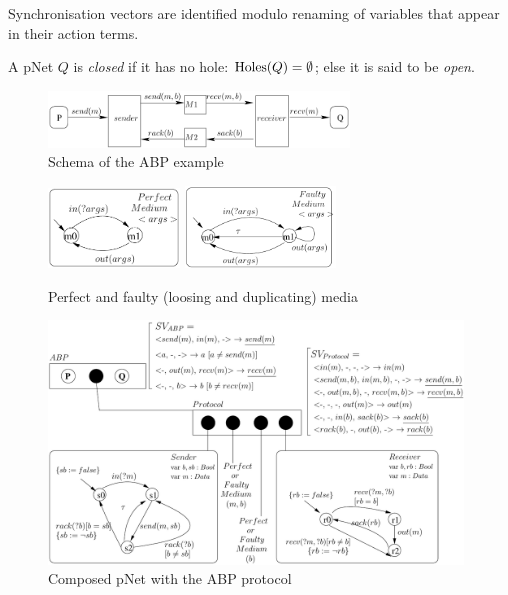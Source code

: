 \documentclass{lncs/llncs}
\newcommand{\TODO}[1]{\textcolor{red}{\textbf{[TODO:#1]}}}
\begin{document}
Synchronisation vectors are identified modulo renaming of variables that appear in their 
action terms.

A pNet $Q$ is \emph{closed} if it has no hole: $\operatorname{Holes}(Q)=\emptyset$; else it
is said to be \emph{open}.

\begin{figure}[t]
  \centerline{
   \includegraphics[width=8cm]{XFIG/ABP-Schema}
   }
   \caption{Schema of the ABP example}  \label{ABP:Schema}
\end{figure}

  
\begin{figure}[t]


  \centerline{
   \includegraphics[width=3.5cm]{XFIG/PerfectMedium}
   \hspace{0.5cm}
   \includegraphics[width=4cm]{XFIG/FaultyMedium}
   }
   \caption{Perfect and faulty (loosing and duplicating) media}  \label{schema:ABP-media}

  \vspace{1cm}
  \centerline{\includegraphics[width=11cm]{XFIG/ABP4-Schema}}
  \caption{Composed pNet with the ABP protocol}  \label{schema:ABP-composed}

\end{figure}
\end{document}

